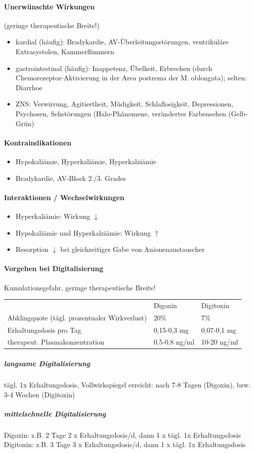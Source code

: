 \documentclass[10pt,a4paper]{report}
\begin{document}
\paragraph{Unerwünschte Wirkungen} (geringe therapeutische Breite!)
\begin{itemize}
	\item kardial (häufig): Bradykardie, AV-Überleitungsstörungen, ventrikuläre Extrasystolen, Kammerflimmern
 	\item gastrointestinal (häufig): Inappetenz, Übelkeit, Erbrechen (durch Chemorezeptor-Aktivierung in der Area postrema der M. oblongata); selten: Diarrhoe
	\item ZNS: Verwirrung, Agitiertheit, Müdigkeit, Schlaflosigkeit, Depressionen, Psychosen, Sehstörungen (Halo-Phänomene, verändertes Farbensehen (Gelb-Grün)
\end{itemize}
\paragraph{Kontraindikationen}
\begin{itemize}
	\item Hypokaliämie, Hyperkaliämie, Hyperkalziämie
	\item Bradykardie, AV-Block 2./3. Grades
\end{itemize}
\paragraph{Interaktionen / Wechselwirkungen}
\begin{itemize}
	\item Hyperkaliämie: Wirkung $\downarrow$
	\item Hypokaliämie und Hyperkalziämie: Wirkung $\uparrow$
	\item Resorption $\downarrow$ bei gleichzeitiger Gabe von Anionenaustauscher 
\end{itemize}
\paragraph{Vorgehen bei Digitalisierung}Kumulationsgefahr, geringe therapeutische Breite!\\
\begin{tabularx}{\textwidth}{XXX}
&Digoxin&Digitoxin\\
Abklingquote (tägl. prozentualer Wirkverlust)&20\%&7\%\\
Erhaltungsdosis pro Tag&0,15-0,3 mg&0,07-0,1 mg\\
therapeut. Plasmakonzentration&0,5-0,8 ng/ml&10-20 ng/ml\\
\end{tabularx}
\subparagraph{langsame Digitalisierung}tägl. 1x Erhaltungsdosis, Vollwirkspiegel erreicht: nach 7-8 Tagen (Digoxin), bzw. 3-4 Wochen (Digitoxin)
\subparagraph{mittelschnelle Digitalisierung}
Digoxin:   z.B. 2 Tage 2 x Erhaltungsdosis/d, dann 1 x tägl. 1x Erhaltungsdosis\\ Digitoxin: z.B. 3 Tage 3 x Erhaltungsdosis/d, dann 1 x tägl. 1x Erhaltungsdosis
\end{document}
